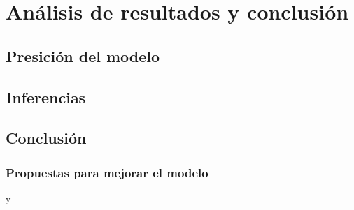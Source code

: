 \chapter{Análisis de resultados y conclusión}\label{ch:ResultadosConclusion}
\section{Presición del modelo}

\section{Inferencias}

\section{Conclusión}

\subsection{Propuestas para mejorar el modelo}y



